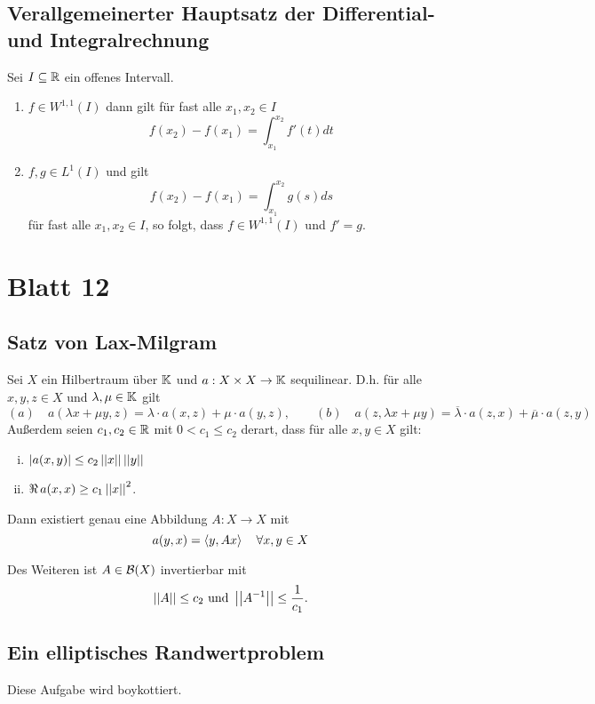 \documentclass[FunkAnaSkript.tex]{subfiles}
\begin{document}
\subsection{ Verallgemeinerter Hauptsatz der Differential- und Integralrechnung}
\label{B11.3}
	Sei $I\subseteq \mathbb{R}$ ein offenes Intervall.
	\begin{enumerate}
		\item $f \in W^{1,1}(I)$ dann gilt für fast alle $x_1, x_2 \in I$ 
		$$f(x_2) - f(x_1) = \int^{x_2}_{x_1} f'(t) dt$$
		\item $f,g \in L^1(I)$ und  gilt
		$$f(x_2) - f(x_1) = \int^{x_2}_{x_1} g(s) ds$$
		für fast alle $x_1,x_2 \in I$, so folgt, dass $f \in W^{1,1}(I)$ und $f' = g$.
	\end{enumerate}


\newpage 
\section{ Blatt 12}


\subsection{ Satz von Lax-Milgram}
\label{B12.1}
	Sei $X$ ein Hilbertraum über $\mathbb{K}$ und $a : X \times X \to \mathbb{K}$ sequilinear. D.h. für alle $x,y,z \in X$ und $\lambda,\mu \in\mathbb{K}$ gilt
	 $$ (a)\quad a(\lambda x + \mu y ,z) = \lambda \cdot a(x,z) + \mu \cdot a(y,z),\qquad
		(b)\quad a(z, \lambda x + \mu y ) = \overline{\lambda} \cdot a(z,x) + \overline{\mu} \cdot a(z,y)$$
	Außerdem seien $c_1, c_2 \in \mathbb{R}$ mit $0< c_1 \leq c_2$ derart, dass für alle $x,y \in X$ gilt:
	\begin{enumerate}[(i)]
	\item $\left\lvert a(x,y) \right\rvert \leq c_2 \left\lvert \left\lvert x \right\rvert \right\rvert \left\lvert \left\lvert y \right\rvert \right\rvert$
	\item $\Re \, a(x,x) \geq c_1 \left\lvert \left\lvert x \right\rvert \right\rvert^2$.
	\end{enumerate}
	
	Dann existiert genau eine Abbildung $A: X\to X$ mit
	$$a(y,x) = \left \langle y,Ax \right \rangle \quad \forall x,y \in X$$
	
	Des Weiteren ist $A \in \mathcal{B}(X)$ invertierbar mit
	$$\left\lvert \left\lvert A \right\rvert \right\rvert \leq c_2 \text{ und } \left\lvert \left\lvert A^{-1} \right\rvert \right\rvert \leq \frac{1}{c_1}.$$	 
	
	

\subsection{ Ein elliptisches Randwertproblem}
\label{B12.2}
	Diese Aufgabe wird boykottiert.
	
\end{document}
